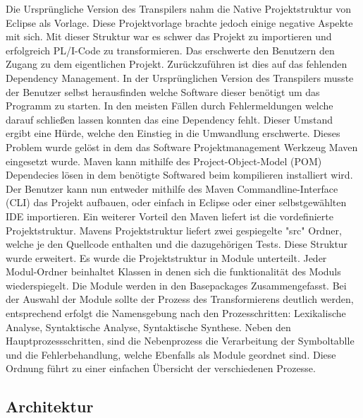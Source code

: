 Die Ursprüngliche Version des Transpilers nahm die Native Projektstruktur von Eclipse als Vorlage. Diese Projektvorlage brachte jedoch einige negative Aspekte mit sich. Mit dieser Struktur war es schwer das Projekt zu importieren und erfolgreich PL/I-Code zu transformieren. Das erschwerte den Benutzern den Zugang zu dem eigentlichen Projekt.
Zurückzuführen ist dies auf das fehlenden Dependency Management. In der Ursprünglichen Version des Transpilers musste der Benutzer selbst herausfinden welche Software dieser benötigt um das Programm zu starten. In den meisten Fällen durch Fehlermeldungen welche darauf schließen lassen konnten das eine Dependency fehlt. Dieser Umstand ergibt eine Hürde, welche den Einstieg in die Umwandlung erschwerte. 
Dieses Problem wurde gelöst in dem das Software Projektmanagement Werkzeug Maven eingesetzt wurde. Maven kann mithilfe des Project-Object-Model (POM) Dependecies lösen in dem benötigte Softwared beim kompilieren installiert wird. Der Benutzer kann nun entweder mithilfe des Maven Commandline-Interface (CLI) das Projekt aufbauen, oder einfach in Eclipse oder einer selbstgewählten IDE importieren.
Ein weiterer Vorteil den Maven liefert ist die vordefinierte Projektstruktur. Mavens Projektstruktur liefert zwei gespiegelte "src" Ordner, welche je den Quellcode enthalten und die dazugehörigen Tests. Diese Struktur wurde erweitert. Es wurde die Projektstruktur in Module unterteilt. Jeder Modul-Ordner beinhaltet Klassen in denen sich die funktionalität des Moduls wiederspiegelt. Die Module werden in den Basepackages Zusammengefasst. Bei der Auswahl der Module sollte der Prozess des Transformierens deutlich werden, entsprechend erfolgt die Namensgebung nach den Prozesschritten: Lexikalische Analyse, Syntaktische Analyse, Syntaktische Synthese. Neben den Hauptprozessschritten, sind die Nebenprozess die Verarbeitung der Symboltablle und die Fehlerbehandlung, welche Ebenfalls als Module geordnet sind. Diese Ordnung führt zu einer einfachen Übersicht der verschiedenen Prozesse.


\subsection{Architektur} 

